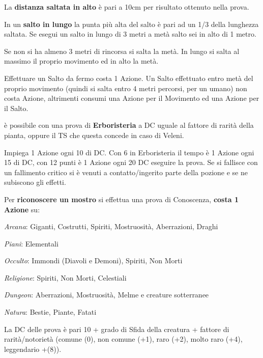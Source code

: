 \documentclass[landscape,10pt,a4paper]{article}
\begin{document}
\begin{multicols}{3}
\begin{dmbox}[title=Atletica]
La \textbf{distanza saltata in alto} è pari a 10cm per risultato ottenuto nella prova.

In un \textbf{salto in lungo} la punta più alta del salto è pari ad un 1/3 della lunghezza saltata. Se esegui un salto in lungo di 3 metri a metà salto sei in alto di 1 metro.

Se non si ha almeno 3 metri di rincorsa si salta la metà. In lungo si salta al massimo il proprio movimento ed in alto la metà.

Effettuare un Salto da fermo costa 1 Azione. Un Salto effettuato entro metà del proprio movimento (quindi si salta entro 4 metri percorsi, per un umano) non costa Azione, altrimenti consumi una Azione per il Movimento ed una Azione per il Salto.
\end{dmbox}		

\begin{dmbox}[title=Identificare una pozione o veleno naturale]	
è possibile con una prova di \textbf{Erboristeria} a DC uguale al fattore di rarità della pianta, oppure il TS che questa concede in caso di Veleni.

Impiega 1 Azione ogni 10 di DC. Con 6 in Erboristeria il tempo è 1 Azione ogni 15 di DC, con 12 punti è 1 Azione ogni 20 DC eseguire la prova. Se si fallisce con un fallimento critico si è venuti a contatto/ingerito parte della pozione e se ne subiscono gli effetti.
\end{dmbox}		

\begin{dmbox}[title=Riconoscere i mostri]	

Per \textbf{riconoscere un mostro} si effettua una prova di Conoscenza, \textbf{costa 1 Azione} su:

\medskip

\emph{Arcana}: Giganti, Costrutti, Spiriti, Mostruosità, Aberrazioni, Draghi

\emph{Piani}: Elementali

\emph{Occulto}: Immondi (Diavoli e Demoni), Spiriti, Non Morti

\emph{Religione}: Spiriti, Non Morti, Celestiali

\emph{Dungeon}: Aberrazioni, Mostruosità, Melme e creature sotterranee

\emph{Natura}: Bestie, Piante, Fatati

\medskip

La DC delle prova è pari 10 + grado di Sfida della creatura + fattore di rarità/notorietà (comune (0), non comune (+1), raro (+2), molto raro (+4), leggendario +(8)).


\end{dmbox}
\end{multicols}
\end{document}

